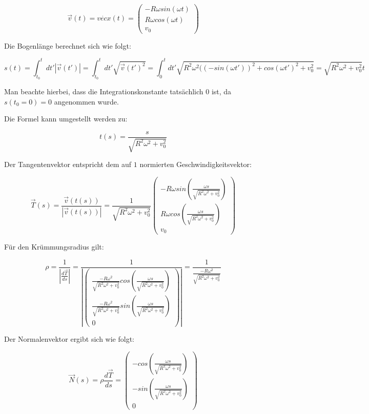 \documentclass{theozettel}
\begin{document}
$$
\vec{v	}(t) = \dot{vec{x}}(t) = \begin{pmatrix}
- R \omega sin(\omega t) \\
R \omega cos(\omega t) \\
v_0
\end{pmatrix}
$$

Die Bogenlänge berechnet sich wie folgt:

$$
s(t) =  \int_{t_0}^{t} d t' | \vec{v}(t') | = \int_{t_0}^{t} d t' \sqrt{\vec{v}(t')^{2}} = \int_{0}^{t} d t' \sqrt{R^{2}\omega^{2} ((-sin(\omega t'))^{2} + cos(\omega t')^{2} + v_0^{2}} = \sqrt{R^{2} \omega^{2} + v_0^{2}} t
$$

Man beachte hierbei, dass die Integrationskonstante tatsächlich $0$ ist, da $s(t_0 = 0) = 0$ angenommen wurde.

Die Formel kann umgestellt werden zu:

$$
t(s) = \frac{s}{\sqrt{R^{2} \omega^{2} + v_0^{2}}}
$$

Der Tangentenvektor entspricht dem auf $1$ normierten Geschwindigkeitsvektor:

$$
\vec{T}(s) = \frac{\vec{v}(t(s))}{|\vec{v}(t(s))|} = \frac{1}{\sqrt{R^{2} \omega^{2} + v_0^{2}}} \begin{pmatrix}
- R \omega sin(\frac{\omega s}{\sqrt{R^{2} \omega^{2} + v_0^{2}}}) \\
R \omega cos(\frac{\omega s}{\sqrt{R^{2} \omega^{2} + v_0^{2}}}) \\
v_0
\end{pmatrix}
$$

Für den Krümmungsradius gilt:

$$
\rho = \frac{1}{|\frac{d\vec{T}}{ds}|} = \frac{1}{|\begin{pmatrix}
\frac{- R \omega^{2}}{\sqrt{R^{2} \omega^{2} + v_0^{2}}}cos(\frac{\omega s}{\sqrt{R^{2} \omega^{2} + v_0^{2}}}) \\
\frac{- R \omega^{2}}{\sqrt{R^{2} \omega^{2} + v_0^{2}}}sin(\frac{\omega s}{\sqrt{R^{2} \omega^{2} + v_0^{2}}}) \\
0
\end{pmatrix} |} = \frac{1}{\frac{- R \omega^{2}}{\sqrt{R^{2} \omega^{2} + v_0^{2}}}}
$$

Der Normalenvektor ergibt sich wie folgt:

$$
\vec{N}(s) = \rho \frac{d\vec{T}}{ds} =\begin{pmatrix}
-cos(\frac{\omega s}{\sqrt{R^{2} \omega^{2} + v_0^{2}}}) \\
-sin(\frac{\omega s}{\sqrt{R^{2} \omega^{2} + v_0^{2}}}) \\
0
\end{pmatrix} 
$$
\end{document}
